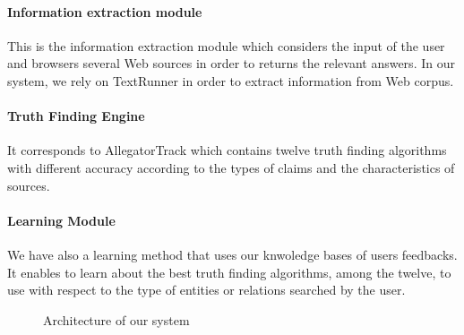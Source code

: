 \documentclass{sig-alternate}
\begin{document}
\paragraph*{Information extraction module} This is the information 
extraction module which considers the input of the user and browsers
several Web sources in order to returns the relevant answers. In our 
system, we rely on TextRunner in order to extract information from Web corpus.

\paragraph*{Truth Finding Engine} It corresponds to AllegatorTrack which contains
twelve truth finding algorithms with different accuracy according to the types of 
claims and the characteristics of sources.

\paragraph*{Learning Module} We have also a learning method that uses our knwoledge
bases of users feedbacks. It enables to learn about the best truth finding algorithms,
among the twelve, to use with respect to the type of entities or relations searched by 
the user.

\begin{figure}[ht]
\caption{Architecture of our system}\label{system_architecture}
\end{figure}
\end{document}
